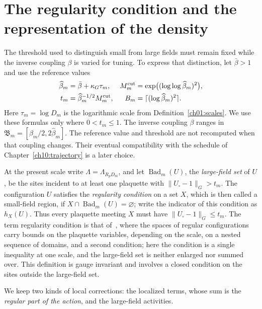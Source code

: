 \section{The regularity condition and the representation of the density}
\label{ch04:density-coordinates}

The threshold used to distinguish small from large fields must remain fixed
while the inverse coupling $\beta$ is varied for tuning. To express that distinction,
let $\bar\beta>1$ and use the reference values
\begin{align}
 \widehat\beta_m&=\bar\beta+\kappa_G\tau_m,&
 M_m^{\rm cut}&=\exp\bigl((\log\log\widehat\beta_m)^2\bigr),\\
 t_m&=\widehat\beta_m^{-1/2}M_m^{\rm cut},&
 B_m&=\lceil(\log\widehat\beta_m)^2\rceil.
 \label{ch04:thresholds}
\end{align}
Here $\tau_m=\log D_m$ is the logarithmic scale from
Definition~\ref{ch01:scales}. We use these formulas only where $0<t_m\le1$.
The inverse coupling $\beta$ ranges in
$\mathfrak B_m=[\widehat\beta_m/2,2\widehat\beta_m]$.
The reference value and threshold are not recomputed when that coupling
changes. Their eventual compatibility with the schedule of Chapter~\ref{ch10:trajectory} is a later
choice.

At the present scale write $\Lambda=\Lambda_{R_pD_m}$, and let
$\operatorname{Bad}_m(U)$, the \emph{large-field set} of $U$, be the sites incident to at least one plaquette
with $\|U_\square-1\|_G>t_m$. The configuration $U$ satisfies the \emph{regularity condition} on a set $X$, which is then called a small-field region, if
$X\cap\operatorname{Bad}_m(U)=\varnothing$; write the indicator of this condition as $h_X(U)$.
Thus every plaquette meeting $X$ must have $\|U_\square-1\|_G\le t_m$. The term regularity condition is that of~\cite{Balaban1985Spaces}, where the spaces of regular configurations carry bounds on the plaquette variables, depending on the scale, on a nested sequence of domains, and a second condition; here the condition is a single inequality at one scale, and the large-field set is neither enlarged nor summed over. This definition is
gauge invariant and involves a closed condition on the sites outside the large-field set.

We keep two kinds of local corrections: the localized terms, whose sum is the \emph{regular part of the action}, and the large-field activities.


